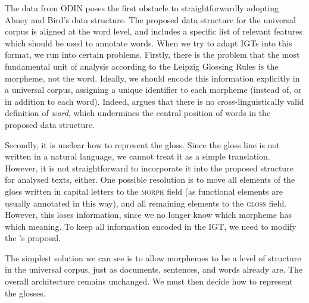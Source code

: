 The data from ODIN poses the first obstacle to straightforwardly adopting Abney and Bird's data structure. 
The proposed data structure for the universal corpus is aligned at the word level, and includes a specific list of relevant features which should be used to annotate words. When we try to adapt IGTs into this format, we run into certain problems.  Firstly, there is the problem that the most fundamental unit of analysis according to the Leipzig Glossing Rules is the morpheme, not the word.  Ideally, we should encode this information explicitly in a universal corpus, assigning a unique identifier to each morpheme (instead of, or in addition to each word). Indeed,  argues that there is no cross-linguistically valid definition of \textit{word}, which undermines the central position of words in the proposed data structure.

Secondly, it is unclear how to represent the gloss.  Since the gloss line is not written in a natural language, we cannot treat it as a simple translation.  However, it is not straightforward to incorporate it into the proposed structure for analysed texts, either.  
One possible resolution is to move all elements of the gloss written in capital letters to the \textsc{morph} field (as functional elements are usually annotated in this way), and all remaining elements to the \textsc{gloss} field.  However, this loses information, since we no longer know which morpheme has which meaning.  To keep all information encoded in the IGT, we need to modify the 's proposal.

The simplest solution we can see is to allow morphemes to be a level of structure in the universal corpus, just as documents, sentences, and words already are.  The overall architecture remains unchanged.  We must then decide how to represent the glosses.

